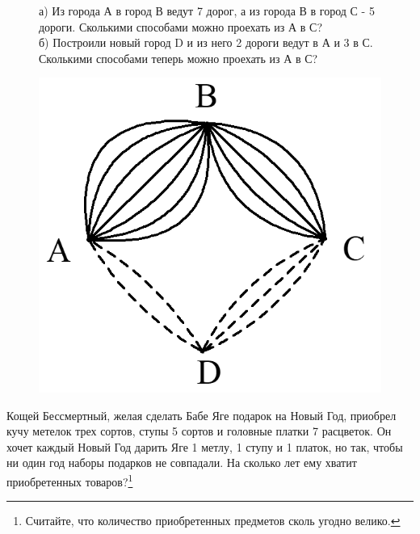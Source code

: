 \begin{figure}[!h]
\begin{minipage}{0.79\linewidth}\setlength{\parindent}{1.5em}
\begin{ex}\label{u14}
	а) Из города А в город В ведут 7 дорог, а из города В в город С - 5 дороги. Сколькими способами можно проехать из А в С?
	\\	
	б) Построили новый город D и из него 2 дороги ведут в А и 3 в С. Сколькими способами теперь можно проехать из А в С?
\end{ex}
\end{minipage}
\begin{minipage}{0.2\linewidth}
    \includegraphics[scale=0.17]{./img/ways2}
\end{minipage}
\end{figure}

\begin{ex}\label{u15}
	Кощей Бессмертный, желая сделать Бабе Яге подарок на Новый Год, приобрел кучу метелок трех сортов, ступы 5 сортов и головные платки 7 расцветок. Он хочет каждый Новый Год дарить Яге 1 метлу, 1 ступу и 1 платок, но так, чтобы ни один год наборы подарков не совпадали. На сколько лет ему хватит приобретенных товаров?\footnote{Считайте, что количество приобретенных предметов сколь угодно велико.}
\end{ex}


